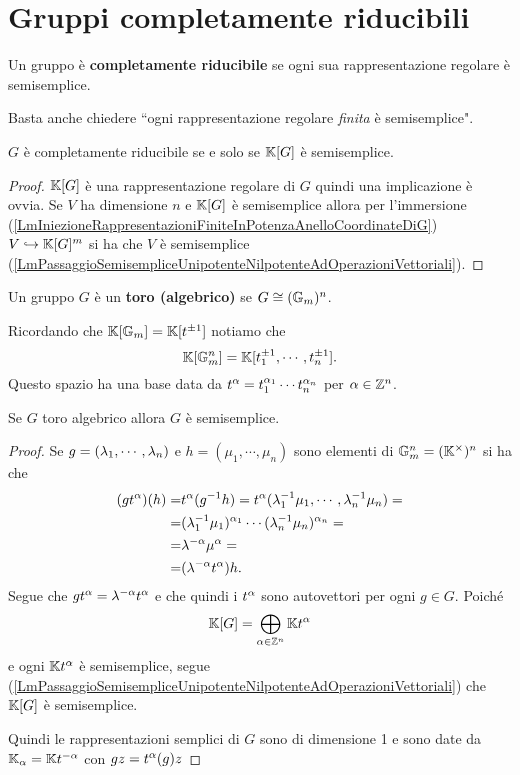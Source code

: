 \section{Gruppi completamente riducibili}
\begin{definition}
Un gruppo \`e \textbf{completamente riducibile} se ogni sua rappresentazione regolare \`e semisemplice.
\end{definition}
\begin{remark}
Basta anche chiedere ``ogni rappresentazione regolare \emph{finita} \`e semisemplice".
\end{remark}

\begin{remark}
$G$ \`e completamente riducibile se e solo se $\mathbb{K}[G]$ \`e semisemplice.
\end{remark}
\begin{proof}
$\mathbb{K}[G]$ \`e una rappresentazione regolare di $G$ quindi una implicazione \`e ovvia.
Se $V$ ha dimensione $n$ e $\mathbb{K}[G]$ \`e semisemplice allora per l'immersione (\ref{LmIniezioneRappresentazioniFiniteInPotenzaAnelloCoordinateDiG}) $V\hookrightarrow \mathbb{K}[G]^m$ si ha che $V$ \`e semisemplice (\ref{LmPassaggioSemisempliceUnipotenteNilpotenteAdOperazioniVettoriali}).
\end{proof}

\begin{definition}
Un gruppo $G$ \`e un \textbf{toro (algebrico)} se $G\cong (\mathbb{G}_m)^n$.
\end{definition}

\begin{remark}
Ricordando che $\mathbb{K}[\mathbb{G}_m]=\mathbb{K}[t^{\pm1}]$ notiamo che
\[\mathbb{K}[\mathbb{G}_m^n]=\mathbb{K}[t_1^{\pm1},\cdots,t_n^{\pm1}].\]
Questo spazio ha una base data da $t^\alpha=t_1^{\alpha_1}\cdots t_n^{\alpha_n}$ per $\alpha\in \mathbb{Z}^n$.
\end{remark}

\begin{proposition}\label{PrToriAlgebriciSonoSemisemplici}
Se $G$ toro algebrico allora $G$ \`e semisemplice.
\end{proposition}
\begin{proof}
Se $g=(\lambda_1,\cdots, \lambda_n)$ e $h=(\mu_1,\cdots, \mu_n)$ sono elementi di $\mathbb{G}_m^n=(\mathbb{K}^\times)^n$ si ha che
\begin{align*}
(gt^\alpha)(h)=&t^\alpha(g^{-1} h)=t^\alpha(\lambda_1^{-1} \mu_1,\cdots, \lambda_n^{-1}\mu_n)=\\
=&(\lambda_1^{-1}\mu_1)^{\alpha_1}\cdots (\lambda_n^{-1}\mu_n)^{\alpha_n}=\\
=&\lambda^{-\alpha}\mu^\alpha=\\
=&(\lambda^{-\alpha}t^\alpha)h.
\end{align*}
Segue che $gt^\alpha=\lambda^{-\alpha}t^\alpha$ e che quindi i $t^\alpha$ sono autovettori per ogni $g\in G$. Poich\'e
\[\mathbb{K}[G]=\bigoplus_{\alpha\in\mathbb{Z}^n} \mathbb{K} t^\alpha\]
e ogni $\mathbb{K} t^\alpha$ \`e semisemplice, segue (\ref{LmPassaggioSemisempliceUnipotenteNilpotenteAdOperazioniVettoriali}) che $\mathbb{K}[G]$ \`e semisemplice.

Quindi le rappresentazioni semplici di $G$ sono di dimensione 1 e sono date da $\mathbb{K}_\alpha=\mathbb{K} t^{-\alpha}$ con $gz=t^\alpha(g)z$
\end{proof}


